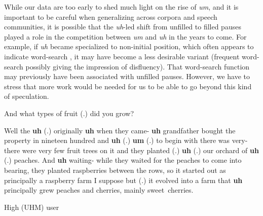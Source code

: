 \documentclass[11pt]{article}
\begin{document}
While our data are too early to shed much light on the rise of \emph{um}, and it
is important to be careful when generalizing across corpora and speech
communities, it is possible that the \emph{uh}-led shift from unfilled to filled
pauses played a role in the competition between \emph{um} and \emph{uh} in the
years to come.
For example, if \emph{uh} became specialized to non-initial
position, which often appears to indicate word-search \parencite{tottie2016,
tottie2017}, it may have become a less desirable variant (frequent word-search
possibly giving the impression of disfluency).
That word-search function may previously have been associated with unfilled
pauses.
However, we have to stress that more work would be needed for us to be able to
go beyond this kind of speculation.

\begin{extract}[ht!]
    \begin{mdframed}[leftmargin=10pt,rightmargin=10pt]
        \begin{dialogue}

             And what types of fruit (.) did you grow?

             Well the \textbf{uh} (.) originally \textbf{uh} when they
            came- \textbf{uh} grandfather bought the property in nineteen hundred
            and \textbf{uh} (.) \textbf{um} (.) to begin with there was very- there
            were very few fruit trees on it and they planted (.) \textbf{uh} (.) our
            orchard of \textbf{uh} (.)  peaches. And \textbf{uh} waiting- while they
            waited for the peaches to come into bearing, they planted raspberries
            between the rows, so it started out as principally a raspberry farm I
            suppose but (.) it evolved into a farm that \textbf{uh} principally grew
            peaches and cherries, mainly sweet~cherries.
        \end{dialogue}
    \end{mdframed}
    \caption{High (UHM) user}\label{ext:highuhm}
\end{extract}
\end{document}

